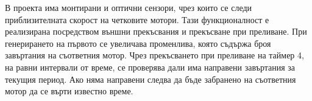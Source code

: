 

В проекта има монтирани и оптични сензори, чрез които се следи приблизителната скорост на четковите мотори. Тази функционалност е реализирана посредством външни прекъсвания и прекъсване при преливане. При генерирането на първото се увеличава променлива, която съдържа броя завъртания на съответния мотор. Чрез прекъсването при преливане на таймер 4, на равни интервали от време, се проверява дали има направени завъртания за текущия период. Ако няма направени следва да бъде забранено на съответния мотор да се върти известно време.


